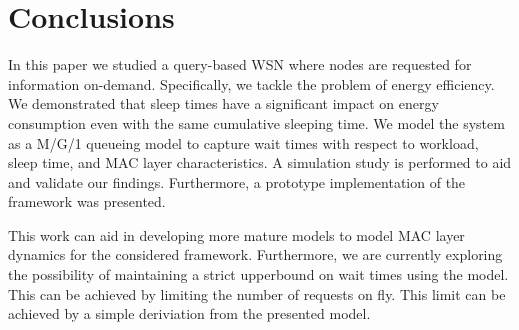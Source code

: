 \section{Conclusions}\label{sec:conclusions}
In this paper we studied a query-based WSN where nodes are requested for information on-demand. Specifically, we tackle the problem of energy efficiency. We demonstrated that sleep times have a significant impact on energy consumption even with the same cumulative sleeping time. We model the system as a M/G/1 queueing model to capture wait times with respect to workload, sleep time, and MAC layer characteristics. A simulation study is performed to aid and validate our findings. Furthermore, a prototype implementation of the framework was presented.

This work can aid in developing more mature models to model MAC layer dynamics for the considered framework. Furthermore, we are currently exploring the possibility of maintaining a strict upperbound on wait times using the model. This can be achieved by limiting the number of requests on fly. This limit can be achieved by a simple deriviation from the presented model.


